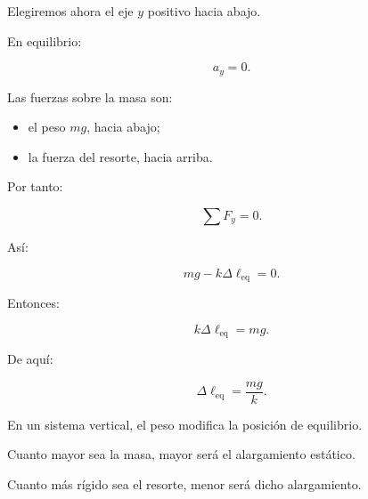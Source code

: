 \begin{center}
\end{center}

Elegiremos ahora el eje \(y\) positivo hacia abajo.

En equilibrio:

\[ a_y=0. \]

Las fuerzas sobre la masa son:

\begin{itemize}
    \item el peso \(mg\), hacia abajo;
    \item la fuerza del resorte, hacia arriba.
\end{itemize}

Por tanto:

\[ \sum F_y=0. \]

Así:

\[ mg-k\Delta\ell_{\mathrm{eq}}=0. \]

Entonces:

\[ \boxed{k\Delta\ell_{\mathrm{eq}}=mg}. \]

De aquí:

\[ \boxed{\Delta\ell_{\mathrm{eq}}=\frac{mg}{k}}. \]

\begin{interpretacion}
En un sistema vertical, el peso modifica la posición de equilibrio.

Cuanto mayor sea la masa, mayor será el alargamiento estático.

Cuanto más rígido sea el resorte, menor será dicho alargamiento.
\end{interpretacion}


